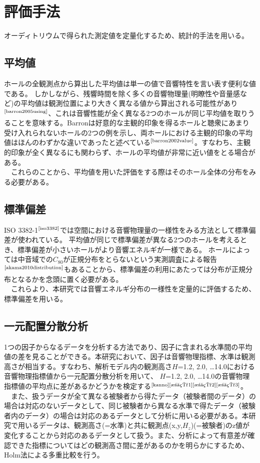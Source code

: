 \pagebreak
\section{評価手法}
オーディトリウムで得られた測定値を定量化するため、統計的手法を用いる。
\subsection{平均値}
ホールの全観測点から算出した平均値は単一の値で音響特性を言い表す便利な値である。
しかしながら、残響時間を除く多くの音響物理量(明瞭性や音量感など)の平均値は観測位置により大きく異なる値から算出される可能性があり$^{\text{\cite{barron2005using}}}$、これは音響性能が全く異なる2つのホールが同じ平均値を取りうることを意味する。Barronは好意的な主観的印象を得るホールと聴衆にあまり受け入れられないホールの2つの例を示し、両ホールにおける主観的印象の平均値はほんのわずかな違いであったと述べている$^{\text{\cite{barron2002value}}}$。すなわち、主観的印象が全く異なるにも関わらず、ホールの平均値が非常に近い値をとる場合がある。
\\　これらのことから、平均値を用いた評価をする際はそのホール全体の分布をみる必要がある。
\subsection{標準偏差}
ISO 3382-1$^{\text{\cite{iso3382}}}$では空間における音響物理量の一様性をみる方法として標準偏差が使われている。
平均値が同じで標準偏差が異なる2つのホールを考えるとき、標準偏差が小さいホールがより音響エネルギが一様である。
ホールによっては中音域での$C_{80}$が正規分布をとらないという実測調査による報告$^{\text{\cite{akama2010distribution}}}$もあることから、標準偏差の利用にあたっては分布が正規分布となるかを念頭に置く必要がある。
\\　これらより、本研究では音響エネルギ分布の一様性を定量的に評価するため、標準偏差を用いる。

\subsection{一元配置分散分析}
1つの因子からなるデータを分析する方法であり、因子に含まれる水準間の平均値の差を見ることができる。本研究において、因子は音響物理指標、水準は観測高さが相当する。すなわち、解析モデル内の観測高さ$H$=1.2, 2.0, …14.0における音響物理指標値から一元配置分散分析を用いて、
$H$=1.2, 2.0, …14.0の音響物理指標値の平均点に差があるかどうかを検定する$^{\text{\cite{kanno}{\cite{池田1}{\cite{池田2}{\cite{池田3}}}}}}$。
\\　また、扱うデータが全て異なる被験者から得たデータ（被験者間のデータ）の場合は対応のないデータとして、同じ被験者から異なる水準で得たデータ（被験者内のデータ）の場合は対応のあるデータとして分析に用いる必要がある。本研究で用いるデータは、観測高さ(=水準)と共に観測点(x,y,$H_z$)(=被験者)のz値が変化することから対応のあるデータとして扱う。また、分析によって有意差が確認できた指標についてはどの観測高さ間に差があるのかを明らかにするため、Holm法による多重比較を行う。

